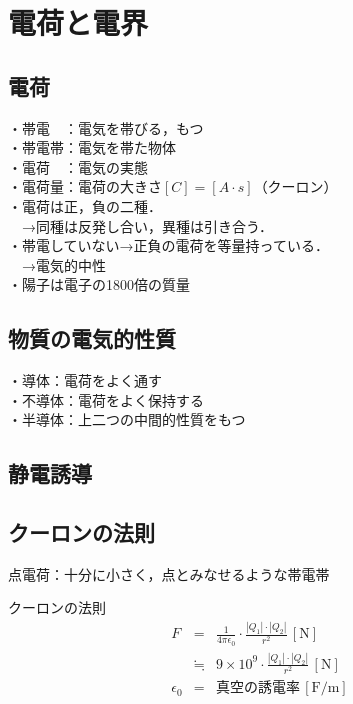 \section{電荷と電界}
\subsection{電荷}
・帯電　：電気を帯びる，もつ\\
・帯電帯：電気を帯た物体\\
・電荷　：電気の実態\\
・電荷量：電荷の大きさ$[C]=[A \cdot s]$（クーロン）\\
・電荷は正，負の二種．\\
　→同種は反発し合い，異種は引き合う．\\
・帯電していない→正負の電荷を等量持っている．\\
　→電気的中性\\
・陽子は電子の1800倍の質量\\

\subsection{物質の電気的性質}
・導体：電荷をよく通す\\
・不導体：電荷をよく保持する\\
・半導体：上二つの中間的性質をもつ\\

\subsection{静電誘導}

\subsection{クーロンの法則}
点電荷：十分に小さく，点とみなせるような帯電帯\\

\begin{itembox}[l]{クーロンの法則}
  \begin{eqnarray}
    F &=&\frac {1}{4\pi \epsilon _{0}}\cdot \frac {\left| Q_{1}\right| \cdot \left| Q_{2}\right| }{r^{2}}\, [\textrm{N}] \\
    &\fallingdotseq& 9\times 10^{9} \cdot \frac {\left| Q_{1}\right| \cdot \left| Q_{2}\right| }{r^{2}}\, [\textrm{N}]\\
    \epsilon_0 &=& \mbox{真空の誘電率}\, [\textrm{F/m}]
  \end{eqnarray}
\end{itembox}

